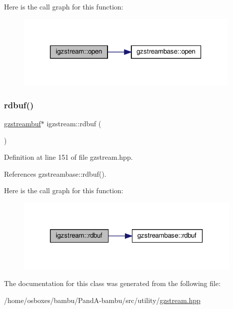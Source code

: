 Here is the call graph for this function\+:
\nopagebreak
\begin{figure}[H]
\begin{center}
\leavevmode
\includegraphics[width=307pt]{dd/dd2/classigzstream_afce1810a57bef9b7ebf9e67c645fa6b9_cgraph}
\end{center}
\end{figure}
\mbox{\label{classigzstream_a8aa14802072efefc34d72b1bbbc56d5d}} 
\subsubsection{\texorpdfstring{rdbuf()}{rdbuf()}}
{\footnotesize\ttfamily \hyperlink{classgzstreambuf}{gzstreambuf}$\ast$ igzstream\+::rdbuf (\begin{DoxyParamCaption}{ }\end{DoxyParamCaption})\hspace{0.3cm}{\ttfamily [inline]}}



Definition at line 151 of file gzstream.\+hpp.



References gzstreambase\+::rdbuf().

Here is the call graph for this function\+:
\nopagebreak
\begin{figure}[H]
\begin{center}
\leavevmode
\includegraphics[width=309pt]{dd/dd2/classigzstream_a8aa14802072efefc34d72b1bbbc56d5d_cgraph}
\end{center}
\end{figure}


The documentation for this class was generated from the following file\+:\begin{DoxyCompactItemize}
\item 
/home/osboxes/bambu/\+Pand\+A-\/bambu/src/utility/\hyperlink{gzstream_8hpp}{gzstream.\+hpp}\end{DoxyCompactItemize}
